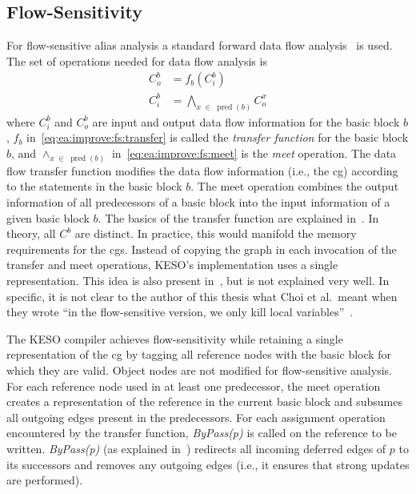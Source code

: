 		\subsection{Flow-Sensitivity}
			\label{subsec:ea:improve:fs}
			For flow-sensitive alias analysis a standard forward data flow analysis~\cite[Sec.~9.2]{aho:07:compilers} is used.
			The set of operations needed for data flow analysis is
			\begin{align}
				C_o^b &= f_b\left( C_i^b \right)\label{eq:ea:improve:fs:transfer}\\
				C_i^b &= \bigwedge_{x \;\in\; \operatorname{pred}(b)} C_o^x\label{eq:ea:improve:fs:meet}
			\end{align}
			where $C_i^b$ and $C_o^b$ are input and output data flow information for the basic block $b$, $f_b$
			in~\cref{eq:ea:improve:fs:transfer} is called the \emph{transfer function} for the basic block $b$, and $\wedge_{x
			\;\in\; \operatorname{pred}(b)}$ in~\cref{eq:ea:improve:fs:meet} is the \emph{meet} operation. The data flow
			transfer function modifies the data flow information (i.e., the \acrlong{cg}) according to the statements in the
			basic block $b$. The meet operation combines the output information of all predecessors of a basic block into the
			input information of a given basic block $b$. The basics of the transfer function are explained in~\cite{lang:12,
			choi:03:toplas}. In theory, all $C^b$ are distinct. In practice, this would manifold the memory requirements for
			the \glspl{cg}. Instead of copying the graph in each invocation of the transfer and meet operations, KESO's
			implementation uses a single representation. This idea is also present in~\cite[Sec.~3]{choi:03:toplas}, but is
			not explained very well. In specific, it is not clear to the author of this thesis what Choi et al.\ meant when
			they wrote \enquote{in the flow-sensitive version, we only kill local variables}~\cite[p.~885]{choi:03:toplas}.

			The KESO compiler achieves flow-sensitivity while retaining a single representation of the \gls{cg} by tagging all
			reference nodes with the basic block for which they are valid. Object nodes are not modified for flow-sensitive
			analysis. For each reference node used in at least one predecessor, the meet operation creates a representation of
			the reference in the current basic block and subsumes all outgoing edges present in the predecessors. For each
			assignment operation encountered by the transfer function, \emph{ByPass(p)} is called on the reference to be
			written. \emph{ByPass(p)} (as explained in~\cite{choi:03:toplas}) redirects all incoming deferred edges of $p$ to
			its successors and removes any outgoing edges (i.e., it ensures that strong updates are performed).

